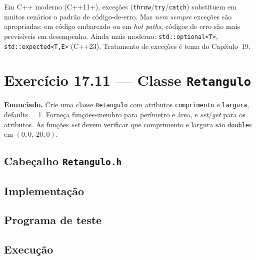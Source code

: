\documentclass[11pt,a4paper]{article}
\begin{document}
\begin{obseng}
Em C++ moderno (C++11+), exce\c{c}\~oes (\texttt{throw}/\texttt{try}/\texttt{catch}) substituem em muitos cen\'arios o padr\~ao de c\'odigo-de-erro. Mas \emph{nem sempre} exce\c{c}\~oes s\~ao apropriadas: em c\'odigo embarcado ou em \emph{hot paths}, c\'odigos de erro s\~ao mais previs\'iveis em desempenho. Ainda mais moderno: \texttt{std::optional<T>}, \texttt{std::expected<T,E>} (C++23). Tratamento de exce\c{c}\~oes \'e tema do Cap\'itulo~19.
\end{obseng}

\newpage
\section{Exerc\'icio 17.11 --- Classe \texttt{Retangulo}}

\begin{enunciado}
\textbf{Enunciado.} Crie uma classe \texttt{Retangulo} com atributos \texttt{comprimento} e \texttt{largura}, defaults = 1. Forne\c{c}a fun\c{c}\~oes-membro para per\'imetro e \'area, e \emph{set}/\emph{get} para os atributos. As fun\c{c}\~oes \emph{set} devem verificar que comprimento e largura s\~ao \texttt{double}s em $(0{,}0,~20{,}0)$.
\end{enunciado}

\subsection*{Cabe\c{c}alho \texttt{Retangulo.h}}



\subsection*{Implementa\c{c}\~ao}



\subsection*{Programa de teste}



\subsection*{Execu\c{c}\~ao}
\end{document}
